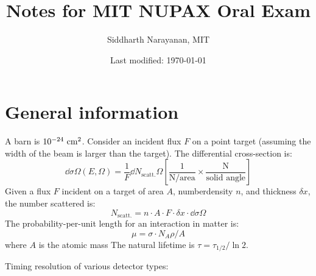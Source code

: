 

\pagestyle{fancy}
\chead{\today}
\setcounter{section}{-1}


\title{Notes for MIT NUPAX Oral Exam}
\date{Last modified: \today}
\author{Siddharth Narayanan, MIT}

\maketitle

\tableofcontents

\section{General information}

A barn is $10^{-24}~\text{cm}^2$. Consider an incident flux $F$ on a point target (assuming the width of the beam is larger than the target). The differential cross-section is:
\begin{equation}
  \dd{\sigma}{\Omega}(E,\Omega) = \frac{1}{F} \dd{N_\text{scatt.}}{\Omega} \left[\frac{1}{\text{N/area}} \times \frac{\text{N}}{\text{solid angle}}\right]
\end{equation}
Given a flux $F$ incident on a target of area $A$, numberdensity $n$, and thickness $\delta x$, the number scattered is:
\begin{equation}
  N_\text{scatt.} = n\cdot A\cdot F\cdot \delta x \cdot \dd\sigma\Omega
\end{equation}
The probability-per-unit length for an interaction in matter is:
\begin{equation}
  \mu = \sigma\cdot N_A\rho/A
\end{equation}
where $A$ is the atomic mass
\noindent The natural lifetime is $\tau = \tau_{1/2}/\ln 2$.

\noindent Timing resolution of various detector types:

